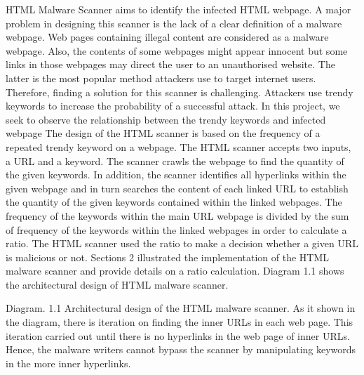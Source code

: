 HTML Malware Scanner aims to identify the infected HTML webpage. A major problem in designing this scanner is the lack of a clear definition of a malware webpage. Web pages containing illegal content are considered as a malware webpage. Also, the contents of some webpages might appear innocent but some links in those webpages may direct the user to an unauthorised website. The latter is the most popular method attackers use to target internet users. Therefore, finding a solution for this scanner is challenging. Attackers use trendy keywords to increase the probability of a successful attack. In this project, we seek to observe the relationship between the trendy keywords and infected webpage
The design of the HTML scanner is based on the frequency of a repeated trendy keyword on a webpage. The HTML scanner accepts two inputs, a URL and a keyword. The scanner crawls the webpage to find the quantity of the given keywords. In addition, the scanner identifies all hyperlinks within the given webpage and in turn searches the content of each linked URL to establish the quantity of the given keywords contained within the linked webpages. The frequency of the keywords within the main URL webpage is divided by the sum of frequency of the keywords within the linked webpages in order to calculate a ratio. The HTML scanner used the ratio to make a decision whether a given URL is malicious or not. Sections 2 illustrated the implementation of the HTML malware scanner and provide details on a ratio calculation. Diagram 1.1 shows the architectural design of HTML malware scanner.

Diagram. 1.1 Architectural design of the HTML malware scanner. 
As it shown in the diagram, there is iteration on finding the inner URLs in each web page. This iteration carried out until there is no hyperlinks in the web page of inner URLs. Hence, the malware writers cannot bypass the scanner by manipulating keywords in the more inner hyperlinks. 
